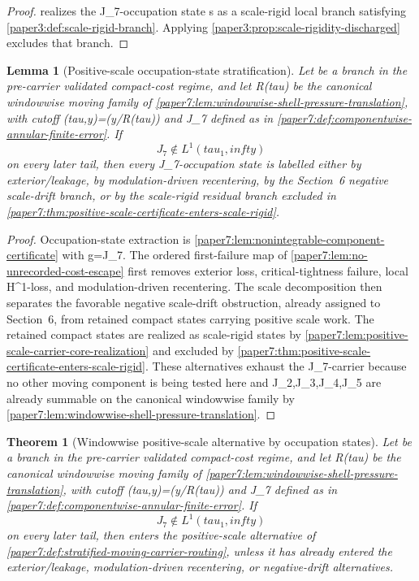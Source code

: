\documentclass[11pt]{amsart}
\def\({}%
\def\){}%
\def\mathfrak#1{#1}%
\def\tau{tau}%
\def\infty{infty}%
\theoremstyle{plain}
\newtheorem{theorem}{Theorem}[section]
\newtheorem{lemma}[lemma]{Lemma}
\theoremstyle{definition}
\theoremstyle{remark}
\begin{document}
\begin{proof}
 realizes the
\(J_7\)-occupation state \(\mathfrak s\) as a scale-rigid local branch satisfying
\cref{paper3:def:scale-rigid-branch}.  Applying
\cref{paper3:prop:scale-rigidity-discharged} excludes that branch.
\end{proof}

\begin{lemma}[Positive-scale occupation-state stratification]
\label{paper7:lem:positive-scale-work-stratification}
Let \(\omega\) be a branch in the pre-carrier validated compact-cost regime,
and let \(R(\tau)\) be the canonical windowwise moving family of
\cref{paper7:lem:windowwise-shell-pressure-translation}, with cutoff
\(\Phi(\tau,y)=\phi(y/R(\tau))\) and \(J_7\) defined as in
\cref{paper7:def:componentwise-annular-finite-error}.  If
\[
  J_7\notin L^1(\tau_1,\infty)
\]
on every later tail, then every \(J_7\)-occupation state is labelled either by
exterior/leakage, by modulation-driven recentering, by the Section~6 negative
scale-drift branch, or by the scale-rigid residual branch excluded in
\cref{paper7:thm:positive-scale-certificate-enters-scale-rigid}.
\end{lemma}

\begin{proof}
Occupation-state extraction is
\cref{paper7:lem:nonintegrable-component-certificate} with \(g=J_7\).
The ordered first-failure map of \cref{paper7:lem:no-unrecorded-cost-escape}
first removes exterior loss, critical-tightness failure, local \(H^1\)-loss,
and modulation-driven recentering.  The scale decomposition then separates
the favorable negative scale-drift obstruction, already assigned to Section~6,
from retained compact states carrying positive scale work.  The retained
compact states are realized as scale-rigid states by
\cref{paper7:lem:positive-scale-carrier-core-realization} and excluded by
\cref{paper7:thm:positive-scale-certificate-enters-scale-rigid}.  These
alternatives exhaust the \(J_7\)-carrier because no other moving component is
being tested here and \(J_2,J_3,J_4,J_5\) are already summable on the
canonical windowwise family by
\cref{paper7:lem:windowwise-shell-pressure-translation}.
\end{proof}

\begin{theorem}[Windowwise positive-scale alternative by occupation states]
\label{paper7:thm:windowwise-positive-scale-routing-certificate}
Let \(\omega\) be a branch in the pre-carrier validated compact-cost regime,
and let \(R(\tau)\) be the canonical windowwise moving family of
\cref{paper7:lem:windowwise-shell-pressure-translation}, with cutoff
\(\Phi(\tau,y)=\phi(y/R(\tau))\) and \(J_7\) defined as in
\cref{paper7:def:componentwise-annular-finite-error}.  If
\[
  J_7\notin L^1(\tau_1,\infty)
\]
on every later tail, then \(\omega\) enters the positive-scale alternative of
\cref{paper7:def:stratified-moving-carrier-routing}, unless it
has already entered the exterior/leakage, modulation-driven recentering, or
negative-drift alternatives.
\end{theorem}
\end{document}
